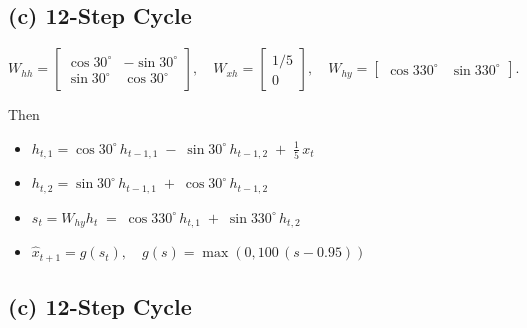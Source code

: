 \documentclass[
]{article}
\providecommand{\tightlist}{%
  \setlength{\itemsep}{0pt}\setlength{\parskip}{0pt}}
\begin{document}
\subsection{(c) 12-Step Cycle}\label{c-12-step-cycle}

\[
W_{hh}=\begin{bmatrix}\cos 30^\circ & -\sin 30^\circ\\ \sin 30^\circ & \cos 30^\circ\end{bmatrix},\quad
W_{xh}=\begin{bmatrix}1/5\\ 0\end{bmatrix},\quad
W_{hy}=\begin{bmatrix}\cos 330^\circ & \sin 330^\circ\end{bmatrix}.
\]

Then

\begin{itemize}
\tightlist
\item
  \(h_{t,1} = \cos 30^\circ \, h_{t-1,1} \;-\; \sin 30^\circ \, h_{t-1,2} \;+\; \tfrac{1}{5}\,x_t\)
\item
  \(h_{t,2} = \sin 30^\circ \, h_{t-1,1} \;+\; \cos 30^\circ \, h_{t-1,2}\)
\item
  \(s_t = W_{hy} h_t \;=\; \cos 330^\circ \, h_{t,1} \;+\; \sin 330^\circ \, h_{t,2}\)
\item
  \(\hat{x}_{t+1} = g(s_t), \quad g(s) = \max(0, 100\,(s-0.95))\)
\end{itemize}

\subsection{(c) 12-Step Cycle}\label{c-12-step-cycle-1}
\end{document}
